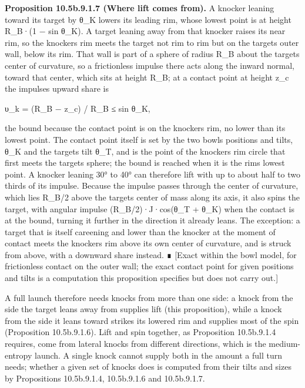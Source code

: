 \documentclass[
]{article}
\begin{document}
\textbf{Proposition 10.5b.9.1.7 (Where lift comes from).} A knocker
leaning toward its target by θ\_K lowers its leading rim, whose lowest
point is at height R\_B·(1 − sin θ\_K). A target leaning away from that
knocker raises its near rim, so the knocker\textquotesingle s rim meets
the target not rim to rim but on the target\textquotesingle s outer
wall, below its rim. That wall is part of a sphere of radius R\_B about
the target\textquotesingle s center of curvature, so a frictionless
impulse there acts along the inward normal, toward that center, which
sits at height R\_B; at a contact point at height z\_c the
impulse\textquotesingle s upward share is

υ\_k = (R\_B − z\_c) / R\_B ≤ sin θ\_K,

the bound because the contact point is on the knocker\textquotesingle s
rim, no lower than its lowest point. The contact point itself is set by
the two bowls\textquotesingle{} positions and tilts, θ\_K and the
target\textquotesingle s tilt θ\_T, and is the point of the
knocker\textquotesingle s rim circle that first meets the
target\textquotesingle s sphere; the bound is reached when it is the
rim\textquotesingle s lowest point. A knocker leaning 30° to 40° can
therefore lift with up to about half to two thirds of its impulse.
Because the impulse passes through the center of curvature, which lies
R\_B/2 above the target\textquotesingle s center of mass along its axis,
it also spins the target, with angular impulse (R\_B/2)·J·cos(θ\_T +
θ\_K) when the contact is at the bound, turning it further in the
direction it already leans. The exception: a target that is itself
careening and lower than the knocker at the moment of contact meets the
knocker\textquotesingle s rim above its own center of curvature, and is
struck from above, with a downward share instead. ∎ {[}Exact within the
bowl model, for frictionless contact on the outer wall; the exact
contact point for given positions and tilts is a computation this
proposition specifies but does not carry out.{]}

A full launch therefore needs knocks from more than one side: a knock
from the side the target leans away from supplies lift (this
proposition), while a knock from the side it leans toward strikes its
lowered rim and supplies most of the spin (Proposition 10.5b.9.1.6).
Lift and spin together, as Proposition 10.5b.9.1.4 requires, come from
lateral knocks from different directions, which is the medium-entropy
launch. A single knock cannot supply both in the amount a full turn
needs; whether a given set of knocks does is computed from their tilts
and sizes by Propositions 10.5b.9.1.4, 10.5b.9.1.6 and 10.5b.9.1.7.
\end{document}
